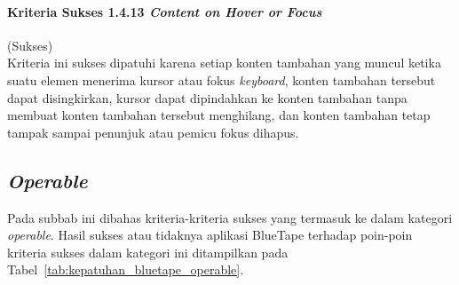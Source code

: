 \paragraph{Kriteria Sukses 1.4.13 \textit{Content on Hover or Focus}}
\label{par:kepatuhan_bluetape_kriteria_sukses_1.4.13}
(Sukses)\\

Kriteria ini sukses dipatuhi karena setiap konten tambahan yang muncul ketika suatu elemen menerima kursor atau fokus \textit{keyboard}, konten tambahan tersebut dapat disingkirkan, kursor dapat dipindahkan ke konten tambahan tanpa membuat konten tambahan tersebut menghilang, dan konten tambahan tetap tampak sampai penunjuk atau pemicu fokus dihapus.

\subsection{\textit{Operable}}
\label{subsec:kepatuhan_bluetape_operable}
Pada subbab ini dibahas kriteria-kriteria sukses yang termasuk ke dalam kategori \textit{operable}. Hasil sukses atau tidaknya aplikasi BlueTape terhadap poin-poin kriteria sukses dalam kategori ini ditampilkan pada \mbox{Tabel \ref{tab:kepatuhan_bluetape_operable}}.

